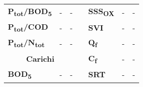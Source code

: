 \begin{table}
\begin{center}
\begin{tabular}{l|c|c|llcc}
		\multicolumn{1}{|l|}{\textbf{P\textsubscript{tot}/BOD\textsubscript{5}}} & -                                                                        & -                                                                          & \multicolumn{1}{l|}{} & \multicolumn{1}{l|}{\textbf{SSS\textsubscript{OX}}}   & \multicolumn{1}{c|}{-}                                                                       & \multicolumn{1}{c|}{-}                                                                          \\ \cline{1-3} \cline{5-7} 
		\multicolumn{1}{|l|}{\textbf{P\textsubscript{tot}/COD}}  & -                                                                        & -                                                                          & \multicolumn{1}{l|}{} & \multicolumn{1}{l|}{\textbf{SVI}}     & \multicolumn{1}{c|}{-}                                                                       & \multicolumn{1}{c|}{-}                                                                          \\ \cline{1-3} \cline{5-7} 
		\multicolumn{1}{|l|}{\textbf{P\textsubscript{tot}/N\textsubscript{tot}}} & -                                                                        & -                                                                          & \multicolumn{1}{l|}{} & \multicolumn{1}{l|}{\textbf{Q\textsubscript{f}}}      & \multicolumn{1}{c|}{-}                                                                       & \multicolumn{1}{c|}{-}                                                                          \\ \cline{1-3} \cline{5-7} 
		\multicolumn{3}{|c|}{\textbf{Carichi}}                                                                                                                                                           & \multicolumn{1}{l|}{} & \multicolumn{1}{l|}{\textbf{C\textsubscript{f}}}      & \multicolumn{1}{c|}{-}                                                                       & \multicolumn{1}{c|}{-}                                                                          \\ \cline{1-3} \cline{5-7} 
		\multicolumn{1}{|l|}{\textbf{BOD\textsubscript{5}}}      & -                                                                        & -                                                                          & \multicolumn{1}{l|}{} & \multicolumn{1}{l|}{\textbf{SRT}}     & \multicolumn{1}{c|}{-}                                                                       & \multicolumn{1}{c|}{-}                                                                          \\ \cline{1-3} \cline{5-7} 

\end{tabular}
\end{center}
\end{table}
